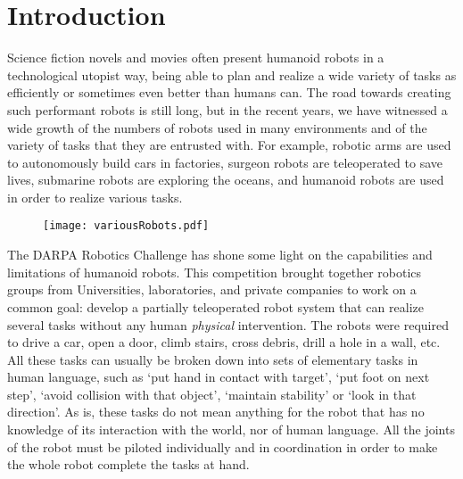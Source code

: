 


\chapter*{Introduction}
\label{cha:introduction}

\graphicspath{{Chapter0-Introduction/Figs/Vector/}{Chapter0-Introduction/Figs/}}

Science fiction novels and movies often present humanoid robots in a technological utopist way, being able to plan and realize a wide variety of tasks as efficiently or sometimes even better than humans can.
The road towards creating such performant robots is still long, but in the recent years, we have witnessed a wide growth of the numbers of robots used in many environments and of the variety of tasks that they are entrusted with.
For example, robotic arms are used to autonomously build cars in factories, surgeon robots are teleoperated to save lives, submarine robots are exploring the oceans, and humanoid robots are used in order to realize various tasks.

\begin{figure}[ht]
  \centering
  \texttt{[image: variousRobots.pdf]}
\label{fig:various}
\end{figure}

The DARPA Robotics Challenge has shone some light on the capabilities and limitations of humanoid robots.
This competition brought together robotics groups from Universities, laboratories, and private companies to work on a common goal: develop a partially teleoperated robot system that can realize several tasks without any human \emph{physical} intervention.
The robots were required to drive a car, open a door, climb stairs, cross debris, drill a hole in a wall, etc.
All these tasks can usually be broken down into sets of elementary tasks in human language, such as `put hand in contact with target', `put foot on next step', `avoid collision with that object', `maintain stability' or `look in that direction'.
As is, these tasks do not mean anything for the robot that has no knowledge of its interaction with the world, nor of human language.
All the joints of the robot must be piloted individually and in coordination in order to make the whole robot complete the tasks at hand.

